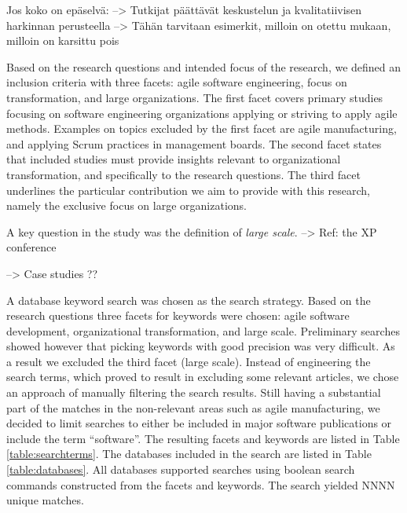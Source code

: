 \documentclass[preprint,authoryear,12pt]{elsarticle}
\begin{document}
Jos koko on epäselvä:
--> Tutkijat päättävät keskustelun ja kvalitatiivisen harkinnan perusteella
--> Tähän tarvitaan esimerkit, milloin on otettu mukaan, milloin on karsittu
    pois




Based on the research questions and intended focus of the research, we defined
an inclusion criteria with three facets: agile software engineering, focus on
transformation, and large organizations. The first facet covers primary studies
focusing on software engineering organizations applying or striving to apply
agile methods. Examples on topics excluded by the first facet are agile
manufacturing, and applying Scrum practices in management boards. The second
facet states that included studies must provide insights relevant to
organizational transformation, and specifically to the research questions.
The third facet underlines the particular contribution we aim to provide with
this research, namely the exclusive focus on large organizations.

A key question in the study was the definition of \emph{large scale}.
--> Ref: the XP conference

--> Case studies ??

A database keyword search was chosen as the search strategy. Based on the
research questions three facets for keywords were chosen: agile software
development, organizational transformation, and large scale. Preliminary
searches showed however that picking keywords with good precision was very
difficult. As a result we excluded the third facet (large scale). Instead of
engineering the search terms, which proved to result in excluding some
relevant articles, we chose an approach of manually filtering the search
results. Still having a substantial part of the matches in the non-relevant  
areas such as agile manufacturing, we decided to limit searches to either be
included in major software publications or include the term ``software''. The
resulting facets and keywords are listed in Table \ref{table:searchterms}. The
databases included in the search are listed in Table \ref{table:databases}. All
databases supported searches using boolean search commands constructed from the
facets and keywords. The search yielded NNNN unique matches.
\end{document}
